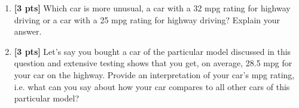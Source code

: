 \begin{enumerate}
\newpage

\item \textbf{[3 pts]} Which car is more unusual, a car with a 32 mpg rating for highway driving or a car with a 25 mpg rating for highway driving? Explain your answer. \\

\item \textbf{ [3 pts]} Let's say you bought a car of the particular model discussed in this question and extensive testing shows that you get, on average, 28.5 mpg for your car on the highway. Provide an interpretation of your car's mpg rating, i.e. what can you say about how your car compares to all other cars of this particular model?   \\

\end{enumerate}
